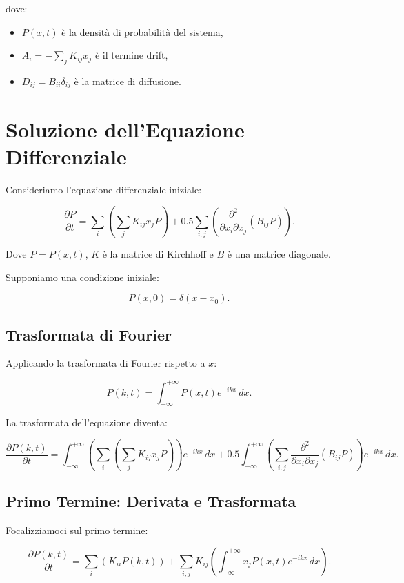 \documentclass{article}
\begin{document}
dove:
\begin{itemize}
    \item \( P(x,t) \) è la densità di probabilità del sistema,
    \item \( A_i = -\sum_j K_{ij} x_j \) è il termine drift,
    \item \( D_{ij} = B_{ii} \delta_{ij} \) è la matrice di diffusione.
\end{itemize}





\section*{Soluzione dell'Equazione Differenziale}

Consideriamo l'equazione differenziale iniziale:

\[
\frac{\partial P}{\partial t} = \sum_i \left( \sum_j K_{ij} x_j P \right) + 0.5 \sum_{i,j} \left( \frac{\partial^2}{\partial x_i \partial x_j} (B_{ij} P) \right).
\]

Dove \( P = P(x, t) \), \( K \) è la matrice di Kirchhoff e \( B \) è una matrice diagonale.

Supponiamo una condizione iniziale:

\[
P(x, 0) = \delta(x - x_0).
\]

\subsection*{Trasformata di Fourier}

Applicando la trasformata di Fourier rispetto a \( x \):

\[
P(k, t) = \int_{-\infty}^{+\infty} P(x, t) e^{-ikx} \, dx.
\]

La trasformata dell'equazione diventa:

\[
\frac{\partial P(k, t)}{\partial t} = \int_{-\infty}^{+\infty} \left( \sum_i \left( \sum_j K_{ij} x_j P \right) \right) e^{-ikx} \, dx + 0.5 \int_{-\infty}^{+\infty} \left( \sum_{i,j} \frac{\partial^2}{\partial x_i \partial x_j} (B_{ij} P) \right) e^{-ikx} \, dx.
\]

\subsection*{Primo Termine: Derivata e Trasformata}

Focalizziamoci sul primo termine:

\[
\frac{\partial P(k, t)}{\partial t} = \sum_i \left( K_{ii} P(k, t) \right) + \sum_{i,j} K_{ij} \left( \int_{-\infty}^{+\infty} x_j P(x, t) e^{-ikx} \, dx \right).
\]
\end{document}
